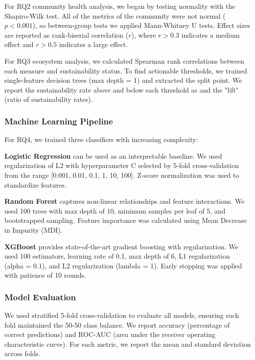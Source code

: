 \documentclass[conference]{IEEEtran}
\begin{document}
For RQ2 community health analysis, we began by testing normality with the Shapiro-Wilk test.  All of the metrics of the community were not normal ($p < 0.001$), so between-group tests we applied  Mann-Whitney U tests. Effect sizes are reported as rank-biserial correlation ($r$), where $r > 0.3$ indicates a medium effect and $r > 0.5$ indicates a large effect.

For RQ3 ecosystem analysis, we calculated Spearman rank correlations between each measure and sustainability status. To find actionable thresholds, we trained single-feature decision trees (max depth = 1) and extracted the split point. We report the sustainability rate above and below each threshold as and the "lift" (ratio of sustainability rates).

\subsubsection{Machine Learning Pipeline}

For RQ4, we trained three classifiers with increasing complexity:

\textbf{Logistic Regression} can be used as an interpretable baseline. We used regularization of L2 with hyperparameter C selected by 5-fold cross-validation from the range [0.001, 0.01, 0.1, 1, 10, 100]. Z-score normalization was used to standardize features.

\textbf{Random Forest} captures non-linear relationships and feature interactions. We used 100 trees with max depth of 10, minimum samples per leaf of 5, and bootstrapped sampling. Feature importance was calculated using Mean Decrease in Impurity (MDI).

\textbf{XGBoost} provides state-of-the-art gradient boosting with regularization. We used 100 estimators, learning rate of 0.1, max depth of 6, L1 regularization (alpha = 0.1), and L2 regularization (lambda = 1). Early stopping was applied with patience of 10 rounds.

\subsubsection{Model Evaluation}

We used stratified 5-fold cross-validation to evaluate all models, ensuring each fold maintained the 50-50 class balance. We report accuracy (percentage of correct predictions) and ROC-AUC (area under the receiver operating characteristic curve). For each metric, we report the mean and standard deviation across folds.
\end{document}
